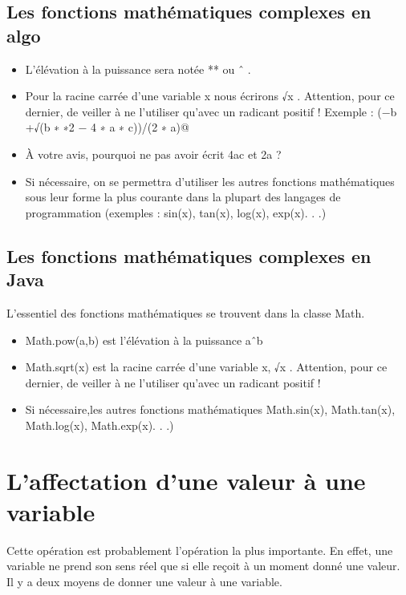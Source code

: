 \documentclass[11pt,a4paper]{article}
\begin{document}
        \subsection{Les fonctions math\'ematiques complexes en algo}
					\begin{itemize}
				
			\item L'\'el\'evation \`a la puissance sera not\'ee ** ou ˆ . 
			\item Pour la racine carr\'ee d'une variable x nous \'ecrirons √x . Attention, pour ce dernier, de veiller \`a ne l'utiliser qu'avec un radicant positif !
            Exemple : \verb@(−b +√(b ∗ ∗2 − 4 ∗ a ∗ c))/(2 ∗ a)@
			\item  \`A votre avis, pourquoi ne pas avoir \'ecrit \guillemotleft  4ac \guillemotright  et \guillemotleft  2a \guillemotright  ?
			\item Si n\'ecessaire, on se permettra d'utiliser les autres fonctions math\'ematiques sous leur forme
            la plus courante dans la plupart des langages de programmation (exemples : sin(x), tan(x), log(x), exp(x). . .)
					\end{itemize}
				
            \par
        \subsection{Les fonctions math\'ematiques complexes en Java}
        L'essentiel des fonctions math\'ematiques se trouvent dans la classe Math.
          
					\begin{itemize}
				
			\item Math.pow(a,b) est l'\'el\'evation \`a la puissance aˆb
			\item Math.sqrt(x) est la racine carr\'ee d'une variable x, √x . Attention, pour ce dernier, de veiller \`a ne l'utiliser qu'avec un radicant positif !
			\item Si n\'ecessaire,les autres fonctions math\'ematiques Math.sin(x), Math.tan(x), Math.log(x), Math.exp(x). . .)
					\end{itemize}
				
            \par
        \section{L'affectation d'une valeur \`a une variable}
				Cette op\'eration est probablement l'op\'eration la plus importante. En effet, une variable ne
        prend son sens r\'eel que si elle re\c coit \`a un moment donn\'e une valeur. Il y a deux moyens de
        donner une valeur \`a une variable.
      
\end{document}
